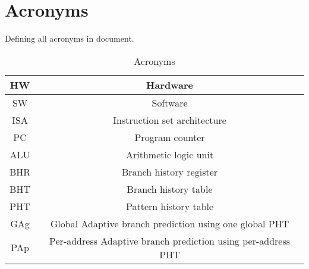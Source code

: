 \documentclass{scrreprt}
\begin{document}
\section*{Acronyms}
    Defining all acronyms in document. 
    \begin{table}[ht]
        \centering
        \begin{tabular}{|c|c|} \hline 
            HW & Hardware\\ \hline 
            SW & Software\\ \hline 
            ISA & Instruction set architecture\\ \hline 
            PC & Program counter\\ \hline 
            ALU & Arithmetic logic unit\\ \hline 
            BHR & Branch history register\\ \hline
            BHT & Branch history table\\ \hline
            PHT & Pattern history table\\ \hline
            GAg & Global Adaptive branch prediction using one global PHT\\ \hline
            PAp & Per-address Adaptive branch prediction using per-address PHT\\ \hline
        \end{tabular}
        \caption{Acronyms}
        \label{tab:table4}
    \end{table}
\end{document}
